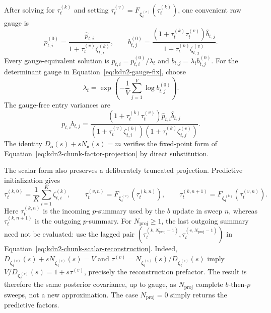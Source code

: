 \documentclass[11pt]{article}
\newcommand{\ve}[1]{\boldsymbol{#1}}
\begin{document}
After solving for $\tau^{(k)}_t$ and setting
$\tau^{(v)}_t=F_{\ve{\zeta}^{(v)}_t}(\tau^{(k)}_t)$, one convenient raw gauge is
\begin{equation}
  p_{t,i}^{(0)}
  =\frac{\widehat p_{t,i}}{1+\tau^{(v)}_t\zeta^{(k)}_{t,i}},
  \qquad
  b_{t,j}^{(0)}
  =\frac{(1+\tau^{(k)}_t\tau^{(v)}_t)\widehat b_{t,j}}
  {1+\tau^{(k)}_t\zeta^{(v)}_{t,j}}.
  \label{eq:kdn2-chunk-scalar-reconstruction}
\end{equation}
Every gauge-equivalent solution is
$p_{t,i}=p_{t,i}^{(0)}/\lambda_t$ and
$b_{t,j}=\lambda_t b_{t,j}^{(0)}$.  For the determinant gauge in
Equation~\eqref{eq:kdn2-gauge-fix}, choose
\begin{equation}
  \lambda_t
  =\exp\!\left(-\frac{1}{V}\sum_{j=1}^{V}\log b_{t,j}^{(0)}\right).
  \label{eq:kdn2-chunk-scalar-gauge}
\end{equation}
The gauge-free entry variances are
\begin{equation}
  p_{t,i}b_{t,j}
  =\frac{(1+\tau^{(k)}_t\tau^{(v)}_t)\widehat p_{t,i}\widehat b_{t,j}}
  {(1+\tau^{(v)}_t\zeta^{(k)}_{t,i})
   (1+\tau^{(k)}_t\zeta^{(v)}_{t,j})}.
  \label{eq:kdn2-chunk-scalar-entry-variance}
\end{equation}
The identity $D_{\ve{a}}(s)+sN_{\ve{a}}(s)=m$ verifies the fixed-point form of
Equation~\eqref{eq:kdn2-chunk-factor-projection} by direct substitution.

The scalar form also preserves a deliberately truncated projection.  Predictive initialization
gives
\begin{equation}
  \tau_t^{(k,0)}=\frac{1}{K}\sum_{i=1}^{K}\zeta^{(k)}_{t,i},
  \qquad
  \tau_t^{(v,n)}=F_{\ve{\zeta}^{(v)}_t}(\tau_t^{(k,n)}),
  \qquad
  \tau_t^{(k,n+1)}=F_{\ve{\zeta}^{(k)}_t}(\tau_t^{(v,n)}).
  \label{eq:kdn2-chunk-truncated-scalar-iteration}
\end{equation}
Here $\tau_t^{(k,n)}$ is the incoming $p$-summary used by the $b$ update in sweep $n$, whereas
$\tau_t^{(k,n+1)}$ is the outgoing $p$-summary.  For $N_{\mathrm{proj}}\ge1$, the last outgoing
summary need not be evaluated: use the lagged pair
$(\tau_t^{(k,N_{\mathrm{proj}}-1)},\tau_t^{(v,N_{\mathrm{proj}}-1)})$ in
Equation~\eqref{eq:kdn2-chunk-scalar-reconstruction}.  Indeed,
$D_{\ve{\zeta}^{(v)}_t}(s)+sN_{\ve{\zeta}^{(v)}_t}(s)=V$ and
$\tau^{(v)}=N_{\ve{\zeta}^{(v)}_t}(s)/D_{\ve{\zeta}^{(v)}_t}(s)$ imply
$V/D_{\ve{\zeta}^{(v)}_t}(s)=1+s\tau^{(v)}$, precisely the reconstruction prefactor.  The result
is therefore the same posterior covariance, up to gauge, as $N_{\mathrm{proj}}$ complete
$b$-then-$p$ sweeps, not a new approximation.  The case $N_{\mathrm{proj}}=0$ simply returns the
predictive factors.
\end{document}
